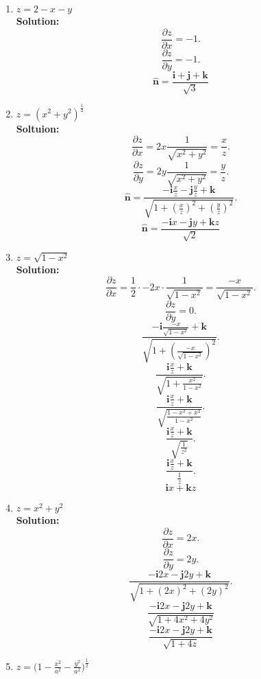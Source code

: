 \documentclass[11pt]{article}
\begin{document}
\begin{enumerate}[label= \textbf{\Alph*.}]
  \item $z = 2-x-y$ \\

    \textbf{Solution:}
    \[
      \frac{\partial z}{\partial x} = -1
    .\]
    \[
      \frac{\partial z}{\partial y} = -1 
    .\]
    \[
      \boxed{\mathbf{\hat{n}} = \frac{\mathbf{i} + \mathbf{j} + \mathbf{k}}{\sqrt{3}}}
    \]

  \item $z = (x^2 + y^2)^{\frac{1}{2}}$\\

    \textbf{Soltuion:}
    \[
      \frac{\partial z}{\partial x} = 2x \frac{1}{\sqrt{x^2 + y^2}} = \frac{x}{z}
    .\]
    \[
      \frac{\partial z}{\partial y} = 2y \frac{1}{\sqrt{x^2+y^2}} = \frac{y}{z}
    .\]
    \[
      \mathbf{\hat{n}} = \frac{-\mathbf{i} \frac{x}{z} - \mathbf{j} \frac{y}{z} + \mathbf{k}}{\sqrt{1 + \left(\frac{x}{z}\right)^2 + \left(\frac{y}{z}\right)^2}}
    .\]
    \[
      \boxed{\mathbf{\hat{n}} = \frac{-\mathbf{i} x - \mathbf{j} y + \mathbf{k} z}{\sqrt{2}}}
    \]
  \item $z = \sqrt{1-x^2}$ \\

    \textbf{Solution:}
  \[
    \frac{\partial z}{\partial x} = \frac{1}{2} \cdot -2x \cdot \frac{1}{\sqrt{1-x^2} } = \frac{-x}{\sqrt{1-x^2} }
  .\] 
  \[
    \frac{\partial z}{\partial y} = 0
  .\]
  \[
    \frac{-\mathbf{i} \frac{-x}{\sqrt{1-x^2} } + \mathbf{k}}{\sqrt{1+(\frac{-x}{\sqrt{1-x^2} })^2} }
  .\]
  \[
    \frac{\mathbf{i} \frac{x}{z }+ \mathbf{k}}{\sqrt{ 1+\frac{x^2}{1-x^2}}}
  .\] 
  \[
    \frac{\mathbf{i} \frac{x}{z} + \mathbf{k}}{\sqrt{ \frac{1-x^2+x^2}{1-x^2}}}
  .\] 
  \[ 
    \frac{\mathbf{i} \frac{x}{z} + \mathbf{k}}{\sqrt{ \frac{1}{z^2}}}
  .\]
  \[
    \frac{\mathbf{i} \frac{x}{z} + \mathbf{k}}{\frac{1}{z}}
  .\] 
  \[
    \boxed{\mathbf{i} x + \mathbf{k} z} 
  \] 
  \item $z = x^2 + y^2$\\

    \textbf{Solution:}
  \[
    \frac{\partial z}{\partial x} = 2x 
  .\] 
  \[
    \frac{\partial z}{\partial y} = 2y
  .\] 
  \[ 
    \frac{-\mathbf{i} 2x - \mathbf{j} 2y + \mathbf{k}}{\sqrt{1 + (2x)^2 + (2y)^2}}
  .\]
  \[
    \frac{-\mathbf{i}2x-\mathbf{j}2y+\mathbf{k}}{\sqrt{1+4x^2+4y^2} }
  \] 
  \[
    \boxed{\frac{-\mathbf{i}2x-\mathbf{j}2y+\mathbf{k}}{\sqrt{1+4z}}}
  \]
\item $z = \biggl(1-\frac{x^2}{a^2} - \frac{y^2}{a^2}\biggr)^{\frac{1}{2}}$ \\


\end{enumerate}
\end{document}

